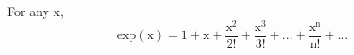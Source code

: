 For any x, 
\[ \mathrm{exp(x)}
 = 1 
+ \mathrm{x}
 + \frac{\mathrm{x}^2}{2!}
+ \frac{\mathrm{x}^3}{3!}
+ ...
+ \frac{\mathrm{x}^{\mathrm{n}}}{\mathrm{n}!} 
+ ... \]

